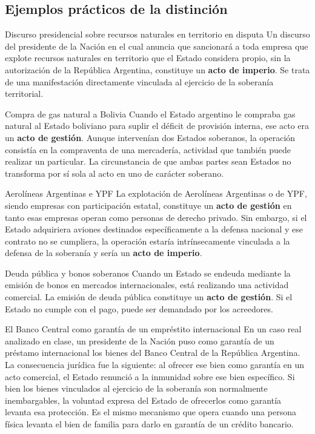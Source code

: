 \documentclass[12pt,oneside]{book}
\begin{document}
\subsection{Ejemplos prácticos de la distinción}

\begin{example}{Discurso presidencial sobre recursos naturales en territorio en disputa}
Un discurso del presidente de la Nación en el cual anuncia que sancionará a toda empresa que explote recursos naturales en territorio que el Estado considera propio, sin la autorización de la República Argentina, constituye un \textbf{acto de imperio}. Se trata de una manifestación directamente vinculada al ejercicio de la soberanía territorial.
\end{example}

\begin{example}{Compra de gas natural a Bolivia}
Cuando el Estado argentino le compraba gas natural al Estado boliviano para suplir el déficit de provisión interna, ese acto era un \textbf{acto de gestión}. Aunque intervenían dos Estados soberanos, la operación consistía en la compraventa de una mercadería, actividad que también puede realizar un particular. La circunstancia de que ambas partes sean Estados no transforma por sí sola al acto en uno de carácter soberano.
\end{example}

\begin{example}{Aerolíneas Argentinas e YPF}
La explotación de Aerolíneas Argentinas o de YPF, siendo empresas con participación estatal, constituye un \textbf{acto de gestión} en tanto esas empresas operan como personas de derecho privado. Sin embargo, si el Estado adquiriera aviones destinados específicamente a la defensa nacional y ese contrato no se cumpliera, la operación estaría intrínsecamente vinculada a la defensa de la soberanía y sería un \textbf{acto de imperio}.
\end{example}

\begin{example}{Deuda pública y bonos soberanos}
Cuando un Estado se endeuda mediante la emisión de bonos en mercados internacionales, está realizando una actividad comercial. La emisión de deuda pública constituye un \textbf{acto de gestión}. Si el Estado no cumple con el pago, puede ser demandado por los acreedores.
\end{example}

\begin{example}{El Banco Central como garantía de un empréstito internacional}
En un caso real analizado en clase, un presidente de la Nación puso como garantía de un préstamo internacional los bienes del Banco Central de la República Argentina. La consecuencia jurídica fue la siguiente: al ofrecer ese bien como garantía en un acto comercial, el Estado renunció a la inmunidad sobre ese bien específico. Si bien los bienes vinculados al ejercicio de la soberanía son normalmente inembargables, la voluntad expresa del Estado de ofrecerlos como garantía levanta esa protección. Es el mismo mecanismo que opera cuando una persona física levanta el bien de familia para darlo en garantía de un crédito bancario.
\end{example}
\end{document}
